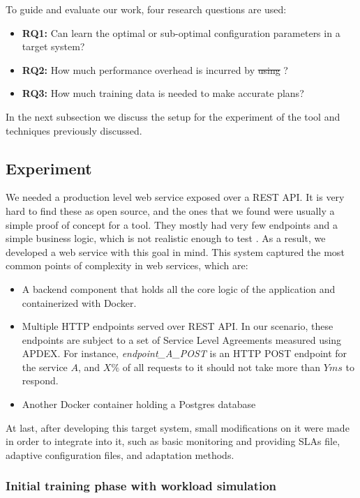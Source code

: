 To guide and evaluate our work, four research questions are used:

\begin{itemize}
  \item \textbf{RQ1:} Can \projectname{} learn the optimal or sub-optimal configuration parameters in a target system?
  \item \textbf{RQ2:} How much performance overhead is incurred by \st{using} \projectname{}?
  \item \textbf{RQ3:} How much training data is needed to make accurate plans?
\end{itemize}

In the next subsection we discuss the setup for the experiment of the tool and techniques previously discussed.

\subsection{Experiment}

We needed a production level web service exposed over a REST API. It is very hard to find these as open source, and the ones that we found were usually a simple proof of concept for a tool. They mostly had very few endpoints and a simple business logic, which is not realistic enough to test \projectname{}. As a result, we developed a web service with this goal in mind. This system captured the most common points of complexity in web services, which are:

\begin{itemize}
  \item A backend component that holds all the core logic of the application and containerized with Docker.
  \item Multiple HTTP endpoints served over REST API. In our scenario, these endpoints are subject to a set of Service Level Agreements measured using APDEX. For instance, \textit{endpoint\_A\_POST} is an HTTP POST endpoint for the service $A$, and $X\%$ of all requests to it should not take more than $Y ms$ to respond.
  \item Another Docker container holding a Postgres database
\end{itemize}

At last, after developing this target system, small modifications on it were made in order to integrate \projectname{} into it, such as basic monitoring and providing SLAs file, adaptive configuration files, and adaptation methods.

\subsubsection{Initial training phase with workload simulation}


